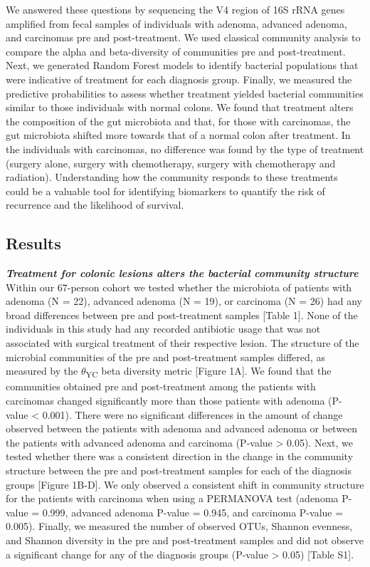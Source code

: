 \documentclass[12pt,]{article}
\begin{document}
We answered these questions by sequencing the V4 region of 16S rRNA
genes amplified from fecal samples of individuals with adenoma, advanced
adenoma, and carcinomas pre and post-treatment. We used classical
community analysis to compare the alpha and beta-diversity of
communities pre and post-treatment. Next, we generated Random Forest
models to identify bacterial populations that were indicative of
treatment for each diagnosis group. Finally, we measured the predictive
probabilities to assess whether treatment yielded bacterial communities
similar to those individuals with normal colons. We found that treatment
alters the composition of the gut microbiota and that, for those with
carcinomas, the gut microbiota shifted more towards that of a normal
colon after treatment. In the individuals with carcinomas, no difference
was found by the type of treatment (surgery alone, surgery with
chemotherapy, surgery with chemotherapy and radiation). Understanding
how the community responds to these treatments could be a valuable tool
for identifying biomarkers to quantify the risk of recurrence and the
likelihood of survival.

\newpage

\subsection{Results}\label{results}

\textbf{\emph{Treatment for colonic lesions alters the bacterial
community structure}} Within our 67-person cohort we tested whether the
microbiota of patients with adenoma (N = 22), advanced adenoma (N = 19),
or carcinoma (N = 26) had any broad differences between pre and
post-treatment samples {[}Table 1{]}. None of the individuals in this
study had any recorded antibiotic usage that was not associated with
surgical treatment of their respective lesion. The structure of the
microbial communities of the pre and post-treatment samples differed, as
measured by the \(\theta\)\textsubscript{YC} beta diversity metric
{[}Figure 1A{]}. We found that the communities obtained pre and
post-treatment among the patients with carcinomas changed significantly
more than those patients with adenoma (P-value \textless{} 0.001). There
were no significant differences in the amount of change observed between
the patients with adenoma and advanced adenoma or between the patients
with advanced adenoma and carcinoma (P-value \textgreater{} 0.05). Next,
we tested whether there was a consistent direction in the change in the
community structure between the pre and post-treatment samples for each
of the diagnosis groups {[}Figure 1B-D{]}. We only observed a consistent
shift in community structure for the patients with carcinoma when using
a PERMANOVA test (adenoma P-value = 0.999, advanced adenoma P-value =
0.945, and carcinoma P-value = 0.005). Finally, we measured the number
of observed OTUs, Shannon evenness, and Shannon diversity in the pre and
post-treatment samples and did not observe a significant change for any
of the diagnosis groups (P-value \textgreater{} 0.05) {[}Table S1{]}.
\end{document}
